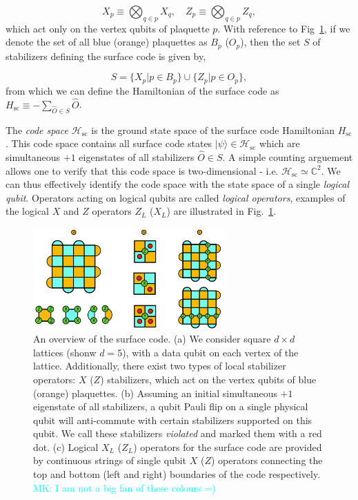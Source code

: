 \documentclass[onecolumn,preprintnumbers,amsmath,amssymb,notitlepage,nofootinbib,longbibliography,superscriptaddress,aps,pra,10pt]{revtex4-1}
\newcommand{\mk}[1]{\textcolor{Cyan}{MK: #1}}
\begin{document}
	\begin{equation}
		X_{p} \equiv \bigotimes_{q \in p} X_q, \quad Z_{p} \equiv \bigotimes_{q \in p} Z_q,
	\end{equation}
	which act only on the vertex qubits of plaquette $p$.
	With reference to Fig~\ref{f:surface_code}, if we denote the set of all blue (orange) plaquettes as $B_p$ ($O_p$), then the set $S$ of stabilizers defining the surface code is given by,

	\begin{equation}
		S = \big\{ X_p \vert p \in B_p  \big\} \cup \big\{ Z_p \vert p \in O_p  \big\},
	\end{equation}
	from which we can define the Hamiltonian of the surface code as $H_{\mathrm{sc}} \equiv -\sum_{\hat{O} \in S}\hat{O}$.

	The \textit{code space} $\mathcal{H}_{\mathrm{sc}}$ is the ground state space of the surface code Hamiltonian $H_{\mathrm{sc}}$.
	This code space contains all surface code states $|\psi\rangle \in \mathcal{H}_{\mathrm{sc}}$ which are simultaneous $+1$ eigenstates of all stabilizers $\hat{O} \in S$.
	A simple counting arguement allows one to verify that this code space is two-dimensional - i.e. $\mathcal{H}_{\mathrm{sc}} \simeq \mathbb{C}^2$.
	We can thus effectively identify the code space with the state space of a single \textit{logical qubit}.
	Operators acting on logical qubits are called \textit{logical operators}, examples of the logical $X$ and $Z$ operators $Z_L$ ($X_L$) are illustrated in Fig.~\ref{f:surface_code}.

	\begin{figure}
		\centering
		\includegraphics[width=0.65\textwidth]{surface_code.pdf}
		\caption{
			An overview of the surface code.
			(a) We consider square $d \times d$ lattices (shonw $d=5$), with a data qubit on each vertex of the lattice.
			Additionally, there exist two types of local stabilizer operators: $X$ ($Z$) stabilizers, which act on the vertex qubits of blue (orange) plaquettes.
			(b) Assuming an initial simultaneous $+1$ eigenstate of all stabilizers, a qubit Pauli flip on a single physical qubit will anti-commute with certain stabilizers supported on this qubit.
			We call these stabilizers \textit{violated} and marked them with a red dot.
			(c) Logical $X_L$ ($Z_L$) operators for the surface code are provided by continuous strings of single qubit $X$ ($Z$) operators connecting the top and bottom (left and right) boundaries of the code respectively.
			\mk{I am not a big fan of these colours =) }}
			\label{f:surface_code}
	\end{figure}
\end{document}
